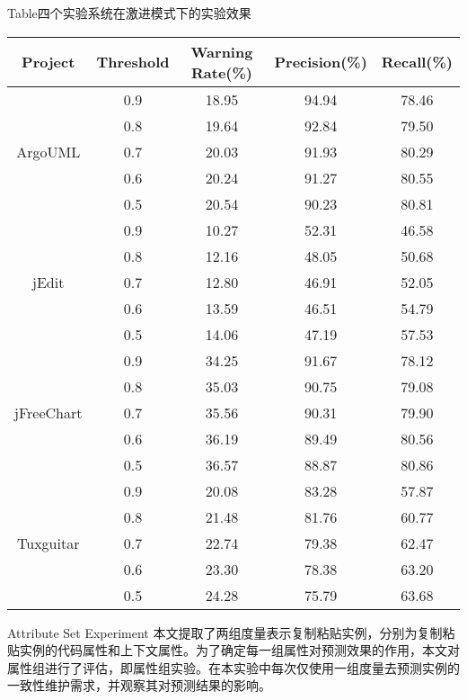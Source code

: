 \begin{table}[htbp]
{Table$\!$}{四个实验系统在激进模式下的实验效果}
\vspace{0.5em}
\centering
\wuhao
\begin{tabular}{ccccc}
\toprule[1.5pt]
\textbf{Project}&\textbf{Threshold}&\textbf{Warning Rate(\%)}&\textbf{Precision(\%)}&\textbf{Recall(\%)}\\
\midrule[1pt]
\multirow{5}{*}{ArgoUML}
&0.9&	18.95&	94.94&	78.46\\
&0.8&	19.64&	92.84&	79.50\\
&0.7&	20.03&	91.93&	80.29\\
&0.6&	20.24&	91.27&	80.55\\
&0.5&	20.54&	90.23&	80.81\\
\multirow{5}{*}{jEdit}
&0.9&	10.27&	52.31&	46.58\\
&0.8&	12.16&	48.05&	50.68\\
&0.7&	12.80&	46.91&	52.05\\
&0.6&	13.59&	46.51&	54.79\\
&0.5&	14.06&	47.19&	57.53\\

\multirow{5}{*}{jFreeChart}
&0.9&	34.25&	91.67&	78.12\\
&0.8&	35.03&	90.75&	79.08\\
&0.7&	35.56&	90.31&	79.90\\
&0.6&	36.19&	89.49&	80.56\\
&0.5&	36.57&	88.87&	80.86\\

\multirow{5}{*}{Tuxguitar}
&0.9&	20.08&	83.28&	57.87\\
&0.8&	21.48&	81.76&	60.77\\
&0.7&	22.74&	79.38&	62.47\\
&0.6&	23.30&	78.38&	63.20\\
&0.5&	24.28&	75.79&	63.68\\

\bottomrule[1.5pt]
\end{tabular}
\end{table}

{Attribute Set Experiment}
本文提取了两组度量表示复制粘贴实例，分别为复制粘贴实例的代码属性和上下文属性。为了确定每一组属性对预测效果的作用，本文对属性组进行了评估，即属性组实验。在本实验中每次仅使用一组度量去预测实例的一致性维护需求，并观察其对预测结果的影响。


